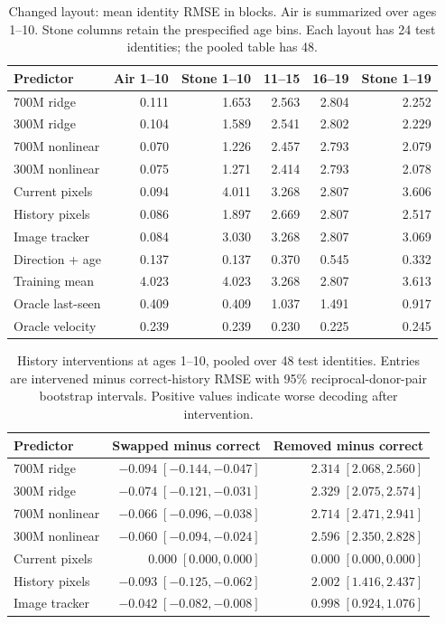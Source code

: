 \begin{table}[!htbp]\centering\small
\caption{Changed layout: mean identity RMSE in blocks. Air is summarized over ages 1--10. Stone columns retain the prespecified age bins. Each layout has 24 test identities; the pooled table has 48.}
\begin{tabular}{@{}lrrrrr@{}}\toprule Predictor & Air 1--10 & Stone 1--10 & 11--15 & 16--19 & Stone 1--19\\\midrule
700M ridge & 0.111 & 1.653 & 2.563 & 2.804 & 2.252\\
300M ridge & 0.104 & 1.589 & 2.541 & 2.802 & 2.229\\
700M nonlinear & 0.070 & 1.226 & 2.457 & 2.793 & 2.079\\
300M nonlinear & 0.075 & 1.271 & 2.414 & 2.793 & 2.078\\
Current pixels & 0.094 & 4.011 & 3.268 & 2.807 & 3.606\\
History pixels & 0.086 & 1.897 & 2.669 & 2.807 & 2.517\\
Image tracker & 0.084 & 3.030 & 3.268 & 2.807 & 3.069\\
Direction + age & 0.137 & 0.137 & 0.370 & 0.545 & 0.332\\
Training mean & 4.023 & 4.023 & 3.268 & 2.807 & 3.613\\
Oracle last-seen & 0.409 & 0.409 & 1.037 & 1.491 & 0.917\\
Oracle velocity & 0.239 & 0.239 & 0.230 & 0.225 & 0.245\\
\bottomrule\end{tabular}\end{table}
\begin{table}[!htbp]\centering\small
\caption{History interventions at ages 1--10, pooled over 48 test identities. Entries are intervened minus correct-history RMSE with 95\% reciprocal-donor-pair bootstrap intervals. Positive values indicate worse decoding after intervention.}
\begin{tabular}{@{}lrr@{}}\toprule Predictor & Swapped minus correct & Removed minus correct\\\midrule
700M ridge & $-0.094\;[-0.144,-0.047]$ & $2.314\;[2.068,2.560]$\\
300M ridge & $-0.074\;[-0.121,-0.031]$ & $2.329\;[2.075,2.574]$\\
700M nonlinear & $-0.066\;[-0.096,-0.038]$ & $2.714\;[2.471,2.941]$\\
300M nonlinear & $-0.060\;[-0.094,-0.024]$ & $2.596\;[2.350,2.828]$\\
Current pixels & $0.000\;[0.000,0.000]$ & $0.000\;[0.000,0.000]$\\
History pixels & $-0.093\;[-0.125,-0.062]$ & $2.002\;[1.416,2.437]$\\
Image tracker & $-0.042\;[-0.082,-0.008]$ & $0.998\;[0.924,1.076]$\\
\bottomrule\end{tabular}\end{table}
